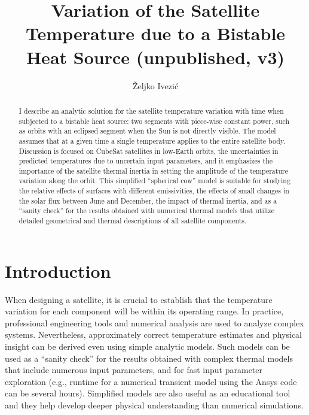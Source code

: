 \documentclass[]{aastex62}
\begin{document}
\title{Variation of the Satellite Temperature due to a Bistable Heat Source (unpublished, v3)}  
 

\author[0000-0001-5250-2633]{\v{Z}eljko Ivezi\'{c}}

\begin{abstract}
I describe an analytic solution for the satellite temperature variation with time when subjected to 
a bistable heat source: two segments with piece-wise constant power, such as orbits with an eclipsed 
segment when the Sun is not directly visible. The model assumes that at a given time a single 
temperature applies to the entire satellite body. Discussion is focused on CubeSat satellites in 
low-Earth orbits, the uncertainties in predicted temperatures due to uncertain input parameters, and 
it emphasizes the importance of the satellite thermal inertia in setting the amplitude of the temperature 
variation along the orbit. This simplified ``spherical cow'' model is suitable for studying the relative 
effects of surfaces with different emissivities, the effects of small changes in the solar flux between 
June and December, the impact of thermal inertia, and as a ``sanity check'' for the results obtained 
with numerical thermal models that utilize detailed geometrical and thermal descriptions of all satellite 
components.  
\end{abstract}



\section{Introduction} 

When designing a satellite, it is crucial to establish that the temperature variation for each component 
will be within its operating range. In practice, professional engineering tools and numerical analysis 
are used to analyze complex systems. Nevertheless, approximately correct temperature estimates 
and physical insight can be derived even using simple analytic models. Such models can be used as
a ``sanity check'' for the results obtained with complex thermal models that include 
numerous input parameters, and for fast input parameter exploration (e.g., runtime for a numerical 
transient model using the Ansys code can be several hours). Simplified models are also useful as an
educational tool and they help develop deeper physical understanding than numerical simulations. 
\end{document}
